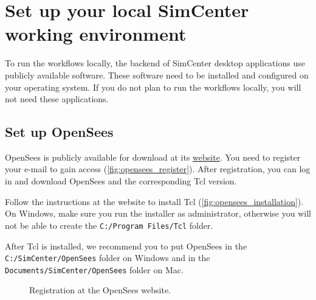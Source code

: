 \section{Set up your local SimCenter working environment}\label{setup}

To run the workflows locally, the backend of SimCenter desktop applications use publicly available software. These software need to be installed and configured on your operating system. If you do not plan to run the workflows locally, you will not need these applications.

\subsection{Set up OpenSees}

OpenSees is publicly available for download at its \href{https://opensees.berkeley.edu/OpenSees/user/download.php}{website}. You need to register your e-mail to gain access (\autoref{fig:opensees_register}). After registration, you can log in and download OpenSees and the corresponding Tcl version. 

Follow the instructions at the website to install Tcl (\autoref{fig:opensees_installation}). On Windows, make sure you run the installer as administrator, otherwise you will not be able to create the \texttt{C:/Program Files/Tcl} folder.

After Tcl is installed, we recommend you to put OpenSees in the \texttt{C:/SimCenter/OpenSees} folder on Windows and in the \texttt{Documents/SimCenter/OpenSees} folder on Mac.

\begin{figure}[!htbp]
  \caption{Registration at the OpenSees website.}
  \label{fig:opensees_register}
\end{figure}

